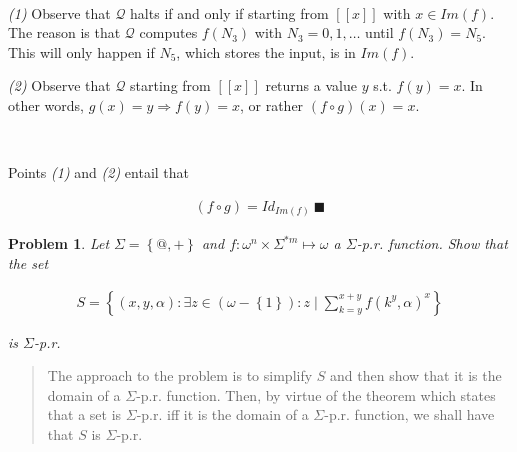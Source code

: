 \documentclass[a4paper, 12pt]{article}
\newtheorem{problem}{Problem}
\newtheorem{problem}{Problem}
\begin{document}
~

\textit{(1)} Observe that $\mathcal{Q}$ halts if and only if starting from $[\![
x ]\!]$ with $x \in Im(f)$. The reason is that $\mathcal{Q}$ computes
$f(N_3)$ with $N_3 = 0, 1, \ldots$ until $f(N_3) = N_5$. This will only happen
if $N_5$, which stores the input, is in $Im(f)$.

\textit{(2)} Observe that $\mathcal{Q}$ starting from $[\![ x ]\!]$ returns a
value $y$ s.t. $f(y) = x$. In other words, $g(x) = y \Rightarrow f(y) = x$, or
rather $(f \circ g)(x) = x$. 

~

Points \textit{(1)} and \textit{(2)} entail that 

\begin{align*}
    (f \circ g) = Id_{Im(f)} ~ \blacksquare
\end{align*}

\pagebreak 

\begin{problem}
    Let $\Sigma = \left\{ @, + \right\} $ and $f : \omega^{n} \times \Sigma^{*m}
    \mapsto \omega$ a $\Sigma$-p.r. function. Show that the set 

    \begin{align*}
        S = \left\{ (x, y, \alpha) : \exists z \in (\omega - \left\{ 1
            \right\})
        : z \mid \sum_{k=y}^{x + y} f(k^y, \alpha)^x \right\} 
    \end{align*}

    is $\Sigma$-p.r. 
\end{problem}


\footnotesize
\begin{quote}

The approach to the problem is to simplify $S$ and then show that it is the
domain of a $\Sigma$-p.r. function. Then, by virtue of the theorem which states
that a set is $\Sigma$-p.r. iff it is the domain of a $\Sigma$-p.r. function, we
shall have that $S$ is $\Sigma$-p.r. 

\end{quote}
\normalsize
\end{document}
